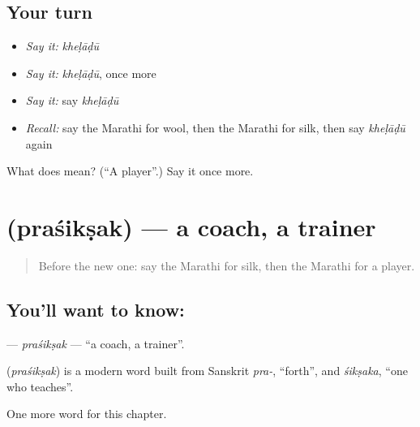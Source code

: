\subsection*{Your turn}
\begin{itemize}
\raggedright
  \item \emph{Say it:} \emph{kheḷāḍū}
  \item \emph{Say it:} \emph{kheḷāḍū}, once more
  \item \emph{Say it:} say \emph{kheḷāḍū}
  \item \emph{Recall:} say the Marathi for wool, then the Marathi for silk, then say \emph{kheḷāḍū} again
\end{itemize}

\begin{tcolorbox}[breakable,colback=teal!4,colframe=teal!35!black,title={Before you move on}]
What does  mean? (\textquotedblleft{}A player\textquotedblright{}.) Say it once more.
\end{tcolorbox}
\section[\texorpdfstring{\mr{प्रशिक्षक} (praśikṣak)}{प्रशिक्षक (praśikṣak)}]{ (praśikṣak) — a coach, a trainer}

\label{lesson:MR-C215-prasiksak}



\begin{quote}
Before the new one: say the Marathi for silk, then the Marathi for a player.
\end{quote}

\subsection*{You'll want to know: }
\textbf{} — \emph{praśikṣak} — \textquotedblleft{}a coach, a trainer\textquotedblright{}.

\begin{cousinweb}
\textbf{} (\emph{praśikṣak}) is a modern word built from Sanskrit \emph{pra-}, \textquotedblleft{}forth\textquotedblright{}, and \emph{śikṣaka}, \textquotedblleft{}one who teaches\textquotedblright{}.
\end{cousinweb}

\begin{grammarlens}[title={What you've built}]
One more word for this chapter.
\end{grammarlens}

